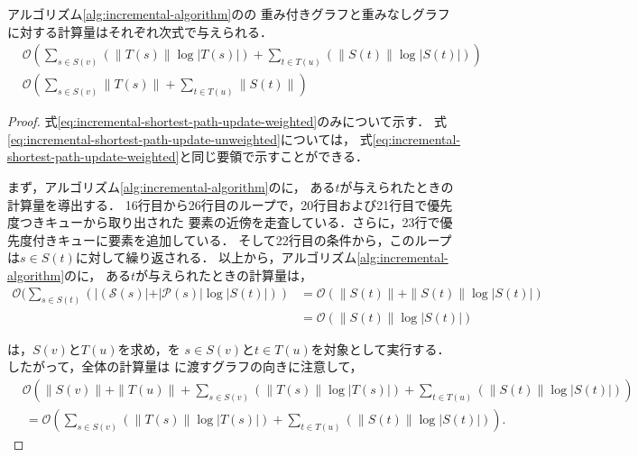 \begin{theorem}
  \label{thm:incremental-shortest-path-update}
  アルゴリズム\ref{alg:incremental-algorithm}のの
  重み付きグラフと重みなしグラフに対する計算量はそれぞれ次式で与えられる．
  \begin{align}
    &\mathcal{O}(\sum_{s\in S(v)}(\|T(s)\|\log|T(s)|)+\sum_{t\in T(u)}(\|S(t)\|\log|S(t)|))
    \label{eq:incremental-shortest-path-update-weighted} \\
    &\mathcal{O}(\sum_{s\in S(v)}\|T(s)\|+\sum_{t\in T(u)}\|S(t)\|)
    \label{eq:incremental-shortest-path-update-unweighted}
  \end{align}
\end{theorem}
\begin{proof}
  式\eqref{eq:incremental-shortest-path-update-weighted}のみについて示す．
  式\eqref{eq:incremental-shortest-path-update-unweighted}については，
  式\eqref{eq:incremental-shortest-path-update-weighted}と同じ要領で示すことができる．

  まず，アルゴリズム\ref{alg:incremental-algorithm}のに，
  ある$t$が与えられたときの計算量を導出する．
  16行目から26行目のループで，20行目および21行目で優先度つきキューから取り出された
  要素の近傍を走査している．さらに，23行で優先度付きキューに要素を追加している．
  そして22行目の条件から，このループは$s\in S(t)$に対して繰り返される．
  以上から，アルゴリズム\ref{alg:incremental-algorithm}のに，
  ある$t$が与えられたときの計算量は，
  \begin{equation*}
    \begin{aligned}
      \mathcal{O}(\sum_{s\in S(t)}(|(\mathcal{S}(s)|+|\mathcal{P}(s)|\log|S(t)|))
      &=\mathcal{O}(\|S(t)\|+\|S(t)\|\log|S(t)|) \\
      &=\mathcal{O}(\|S(t)\|\log|S(t)|)
    \end{aligned}
  \end{equation*}

  は，$S(v)$と$T(u)$を求め，を
  $s\in S(v)$と$t\in T(u)$を対象として実行する．
  したがって，全体の計算量は
  に渡すグラフの向きに注意して，
  \begin{equation*}
    \begin{aligned}
      &\mathcal{O}(\|S(v)\|+\|T(u)\|+\sum_{s\in S(v)}(\|T(s)\|\log|T(s)|)+\sum_{t\in T(u)}(\|S(t)\|\log|S(t)|)) \\
      &\:=\mathcal{O}(\sum_{s\in S(v)}(\|T(s)\|\log|T(s)|)+\sum_{t\in T(u)}(\|S(t)\|\log|S(t)|)).
    \end{aligned}
  \end{equation*}
\end{proof}


